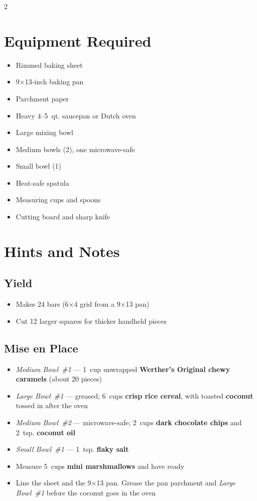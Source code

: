 \documentclass[11pt,letterpaper]{article}
\begin{document}
{\footnotesize
\setlength{\columnsep}{20pt}
\setlength{\multicolsep}{6pt}
\begin{multicols}{2}
\setlength{\parindent}{0pt}
\setlength{\parskip}{2pt}
\setlength{\itemsep}{0pt}
\setlength{\parsep}{0pt}

\section*{Equipment Required}
\begin{itemize}
    \item Rimmed baking sheet
    \item 9×13-inch baking pan
    \item Parchment paper
    \item Heavy 4--5~qt. saucepan or Dutch oven
    \item Large mixing bowl
    \item Medium bowls (2), one microwave-safe
    \item Small bowl (1)
    \item Heat-safe spatula
    \item Measuring cups and spoons
    \item Cutting board and sharp knife
\end{itemize}

\section*{Hints and Notes}

\subsection*{Yield}
\begin{itemize}
    \item Makes 24 bars (6×4 grid from a 9×13 pan)
    \item Cut 12 larger squares for thicker handheld pieces
\end{itemize}

\subsection*{Mise en Place}
\begin{itemize}
    \item \textit{Medium Bowl~\#1} --- 1~cup unwrapped \textbf{Werther's Original chewy caramels} (about 20 pieces)
    \item \textit{Large Bowl~\#1} --- greased; 6~cups \textbf{crisp rice cereal}, with toasted \textbf{coconut} tossed in after the oven
    \item \textit{Medium Bowl~\#2} --- microwave-safe; 2~cups \textbf{dark chocolate chips} and 2~tsp. \textbf{coconut oil}
    \item \textit{Small Bowl~\#1} --- 1~tsp. \textbf{flaky salt}
    \item Measure 5~cups \textbf{mini marshmallows} and have ready
    \item Line the sheet and the 9×13 pan. Grease the pan parchment and \textit{Large Bowl~\#1} before the coconut goes in the oven
\end{itemize}


\end{multicols}}
\end{document}
